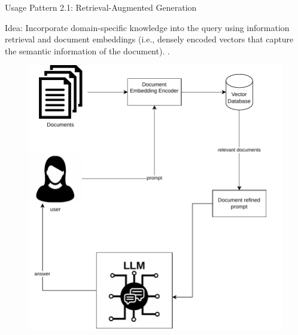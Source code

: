 \documentclass[handout]{beamer}
\begin{document}
\begin{frame}{Usage Pattern 2.1: Retrieval-Augmented Generation}
\begin{scriptsize}
Idea: Incorporate domain-specific knowledge into the query using information retrieval and document embeddings (i.e., densely encoded vectors that capture the semantic information of the document). \cite{lewis2021retrievalaugmented}.

\end{scriptsize}

    \begin{figure}[h]
        	\includegraphics[scale = 0.4]{pics/retrievalaugmented.pdf}
        \end{figure}  


\end{frame}
\end{document}
